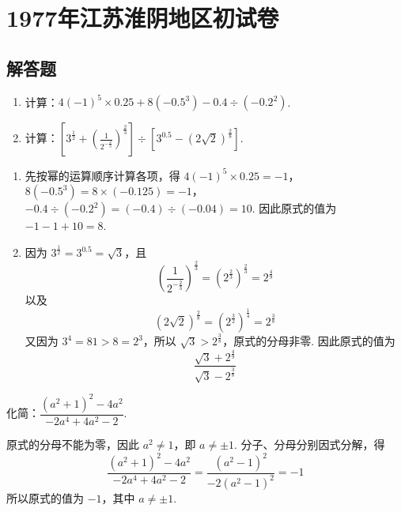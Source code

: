 \chapter{1977年江苏淮阴地区初试卷}

\section{解答题}

\begin{problem}
\begin{enumerate}
    \item 计算：\(4(-1)^5\times 0.25+8(-0.5^3)-0.4\div(-0.2^2)\).

    \item 计算：\(\left[3^{\frac{1}{2}}+\left(\frac{1}{2^{-\frac{2}{3}}}\right)^{\frac{2}{3}}\right]\div\left[3^{0.5}-\left(2\sqrt{2}\right)^{\frac{2}{8}}\right]\).
\end{enumerate}
\end{problem}

\begin{solution}
\begin{enumerate}
    \item 先按幂的运算顺序计算各项，得 \(4(-1)^5\times 0.25=-1\)，\(8(-0.5^3)=8\times(-0.125)=-1\)，\(-0.4\div(-0.2^2)=(-0.4)\div(-0.04)=10\). 因此原式的值为 \(-1-1+10=8\).

    \item 因为 \(3^{\frac12}=3^{0.5}=\sqrt{3}\)，且
    \[
    \left(\frac{1}{2^{-\frac23}}\right)^{\frac23}=\left(2^{\frac23}\right)^{\frac23}=2^{\frac49}
    \]
    以及
    \[
    \left(2\sqrt{2}\right)^{\frac28}=\left(2^{\frac32}\right)^{\frac14}=2^{\frac38}
    \]
    又因为 \(3^4=81>8=2^3\)，所以 \(\sqrt{3}>2^{\frac38}\)，原式的分母非零. 因此原式的值为
    \[
    \frac{\sqrt{3}+2^{\frac49}}{\sqrt{3}-2^{\frac38}}
    \]
\end{enumerate}
\end{solution}

\begin{problem}
化简：\(\dfrac{\left(a^2+1\right)^2-4a^2}{-2a^4+4a^2-2}\).
\end{problem}

\begin{solution}
原式的分母不能为零，因此 \(a^2\ne1\)，即 \(a\ne\pm1\). 分子、分母分别因式分解，得
\[
\frac{\left(a^2+1\right)^2-4a^2}{-2a^4+4a^2-2}
 =\frac{\left(a^2-1\right)^2}{-2\left(a^2-1\right)^2}=-1
\]
所以原式的值为 \(-1\)，其中 \(a\ne\pm1\).
\end{solution}

